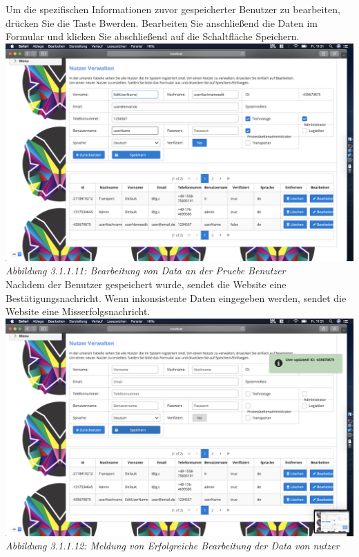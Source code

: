 \documentclass[enabledeprecatedfontcommands,fontsize=12pt,paper=a4,twoside]{scrartcl}
\begin{document}
Um die spezifischen Informationen zuvor gespeicherter Benutzer zu bearbeiten, drücken Sie die Taste Bwerden. Bearbeiten Sie anschließend die Daten im Formular und klicken Sie abschließend auf die Schaltfläche Speichern.
\hypertarget{sc3.1.2.4}{
\includegraphics[width=1\textwidth]{Screenshots/UserEditData.png}
\textit{Abbildung 3.1.1.11: Bearbeitung von Data an der Pruebe Benutzer}
} \\
Nachdem der Benutzer gespeichert wurde, sendet die Website eine Bestätigungsnachricht. Wenn inkonsistente Daten eingegeben werden, sendet die Website eine Misserfolgsnachricht.
\hypertarget{sc3.1.2.5}{
\includegraphics[width=1\textwidth]{Screenshots/editMeldung.png}
\textit{Abbildung 3.1.1.12: Meldung von Erfolgreiche Bearbeitung der Data von nutzer}
} \\
\end{document}
